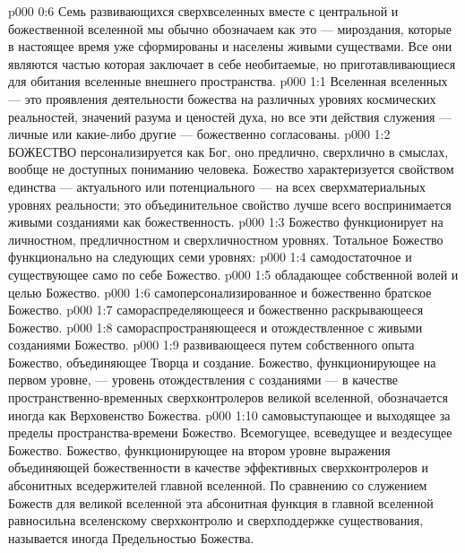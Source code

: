 \vs p000 0:6 Семь развивающихся сверхвселенных вместе с центральной и божественной вселенной мы обычно обозначаем как  это --- мироздания, которые в настоящее время уже сформированы и населены живыми существами. Все они являются частью  которая заключает в себе необитаемые, но приготавливающиеся для обитания вселенные внешнего пространства.
\vs p000 1:1 Вселенная вселенных --- это проявления деятельности божества на различных уровнях космических реальностей, значений разума и ценостей духа, но все эти действия служения --- личные или какие\hyp{}либо другие --- божественно согласованы.
\vs p000 1:2 \pc БОЖЕСТВО персонализируется как Бог, оно предлично, сверхлично в смыслах, вообще не доступных пониманию человека. Божество характеризуется свойством единства --- актуального или потенциального --- на всех сверхматериальных уровнях реальности; это объединительное свойство лучше всего воспринимается живыми созданиями как божественность.
\vs p000 1:3 \pc Божество функционирует на личностном, предличностном и сверхличностном уровнях. Тотальное Божество функционально на следующих семи уровнях:
\vs p000 1:4 \bibnobreakspace {} самодостаточное и существующее само по себе Божество.
\vs p000 1:5 \bibnobreakspace {} обладающее собственной волей и целью Божество.
\vs p000 1:6 \bibnobreakspace {} самоперсонализированное и божественно братское Божество.
\vs p000 1:7 \bibnobreakspace {} самораспределяющееся и божественно раскрывающееся Божество.
\vs p000 1:8 \bibnobreakspace {} самораспространяющееся и отождествленное с живыми созданиями Божество.
\vs p000 1:9 \bibnobreakspace {} развивающееся путем собственного опыта Божество, объединяющее Творца и создание. Божество, функционирующее на первом уровне, --- уровень отождествления с созданиями --- в качестве пространственно\hyp{}временных сверхконтролеров великой вселенной, обозначается иногда как Верховенство Божества.
\vs p000 1:10 \bibnobreakspace {} самовыступающее и выходящее за пределы пространства\hyp{}времени Божество. Всемогущее, всеведущее и вездесущее Божество. Божество, функционирующее на втором уровне выражения объединяющей божественности в качестве эффективных сверхконтролеров и абсонитных вседержителей главной вселенной. По сравнению со служением Божеств для великой вселенной эта абсонитная функция в главной вселенной равносильна вселенскому сверхконтролю и сверхподдержке существования, называется иногда Предельностью Божества.
